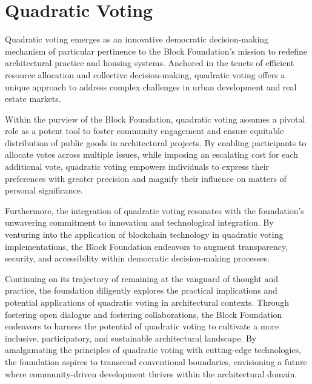 \newpage
\section{Quadratic Voting}

Quadratic voting emerges as an innovative democratic decision-making mechanism of particular pertinence to the Block Foundation's mission to redefine architectural practice and housing systems. Anchored in the tenets of efficient resource allocation and collective decision-making, quadratic voting offers a unique approach to address complex challenges in urban development and real estate markets.

Within the purview of the Block Foundation, quadratic voting assumes a pivotal role as a potent tool to foster community engagement and ensure equitable distribution of public goods in architectural projects. By enabling participants to allocate votes across multiple issues, while imposing an escalating cost for each additional vote, quadratic voting empowers individuals to express their preferences with greater precision and magnify their influence on matters of personal significance.

Furthermore, the integration of quadratic voting resonates with the foundation's unwavering commitment to innovation and technological integration. By venturing into the application of blockchain technology in quadratic voting implementations, the Block Foundation endeavors to augment transparency, security, and accessibility within democratic decision-making processes.

Continuing on its trajectory of remaining at the vanguard of thought and practice, the foundation diligently explores the practical implications and potential applications of quadratic voting in architectural contexts. Through fostering open dialogue and fostering collaborations, the Block Foundation endeavors to harness the potential of quadratic voting to cultivate a more inclusive, participatory, and sustainable architectural landscape. By amalgamating the principles of quadratic voting with cutting-edge technologies, the foundation aspires to transcend conventional boundaries, envisioning a future where community-driven development thrives within the architectural domain.
